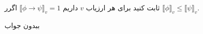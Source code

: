 ثابت کنید برای هر ارزیاب $v$ داریم
$\llbracket \phi\to\psi\rrbracket_v=1$
اگرر
$\llbracket\phi\rrbracket_v\leq\llbracket\psi\rrbracket_v$.
\begin{ans}
ببدون جواب
\end{ans}

